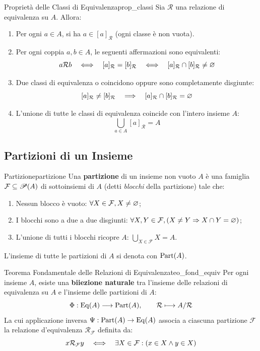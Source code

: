 \begin{proposizione}{Proprietà delle Classi di Equivalenza}{prop_classi}
Sia $\mathcal{R}$ una relazione di equivalenza su $A$. Allora:
\begin{enumerate}
    \item Per ogni $a \in A$, si ha $a \in [a]_\mathcal{R}$ (ogni classe è non vuota).
    \item Per ogni coppia $a, b \in A$, le seguenti affermazioni sono equivalenti:
    \[
        a \mathcal{R} b \quad \Longleftrightarrow \quad [a]_\mathcal{R} = [b]_\mathcal{R} \quad \Longleftrightarrow \quad [a]_\mathcal{R} \cap [b]_\mathcal{R} \neq \varnothing
    \]
    \item Due classi di equivalenza o coincidono oppure sono completamente disgiunte:
    \[
        [a]_\mathcal{R} \neq [b]_\mathcal{R} \quad \Longrightarrow \quad [a]_\mathcal{R} \cap [b]_\mathcal{R} = \varnothing
    \]
    \item L'unione di tutte le classi di equivalenza coincide con l'intero insieme $A$:
    \[
        \bigcup_{a \in A} [a]_\mathcal{R} = A
    \]
\end{enumerate}
\end{proposizione}

\subsection{Partizioni di un Insieme}

\begin{definizione}{Partizione}{partizione}
Una \textbf{partizione} di un insieme non vuoto $A$ è una famiglia $\mathcal{F} \subseteq \mathscr{P}(A)$ di sottoinsiemi di $A$ (detti \emph{blocchi} della partizione) tale che:
\begin{enumerate}
    \item Nessun blocco è vuoto: $\forall X \in \mathcal{F}, X \neq \varnothing$;
    \item I blocchi sono a due a due disgiunti: $\forall X, Y \in \mathcal{F}, (X \neq Y \Rightarrow X \cap Y = \varnothing)$;
    \item L'unione di tutti i blocchi ricopre $A$: $\bigcup_{X \in \mathcal{F}} X = A$.
\end{enumerate}
L'insieme di tutte le partizioni di $A$ si denota con $\operatorname{Part}(A)$.
\end{definizione}

\begin{teorema}{Teorema Fondamentale delle Relazioni di Equivalenza}{teo_fond_equiv}
Per ogni insieme $A$, esiste una \textbf{biiezione naturale} tra l'insieme delle relazioni di equivalenza su $A$ e l'insieme delle partizioni di $A$:
\[
    \Phi: \operatorname{Eq}(A) \longrightarrow \operatorname{Part}(A), \qquad \mathcal{R} \longmapsto A/\mathcal{R}
\]
La cui applicazione inversa $\Psi: \operatorname{Part}(A) \to \operatorname{Eq}(A)$ associa a ciascuna partizione $\mathcal{F}$ la relazione d'equivalenza $\mathcal{R}_\mathcal{F}$ definita da:
\[
    x \mathcal{R}_\mathcal{F} y \quad \Longleftrightarrow \quad \exists X \in \mathcal{F} : (x \in X \wedge y \in X)
\]
\end{teorema}

